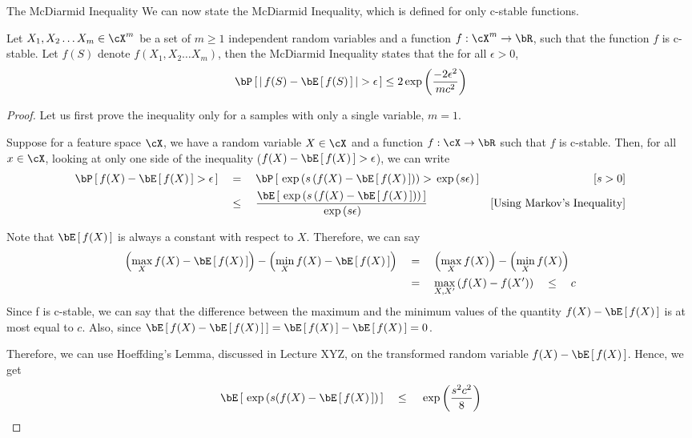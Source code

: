\documentclass[11pt,a4paper]{article}
\begin{document}
\begin{ssection}{The McDiarmid Inequality}
	We can now state the McDiarmid Inequality, which is defined for only c-stable functions. \br
	
	\begin{theorem}
		Let $X_1, X_2 \dots X_m \in \cX^m$ be a set of $m \ge 1$ independent random variables and a function $f : \cX^m \ra \bR$, such that the function $f$ is c-stable. Let $f(S)$ denote $f(X_1, X_2 \dots X_m)$, then the McDiarmid Inequality states that the for all $\epsilon > 0$,
		\begin{equation}
			\prob{\abs{f(S) - \E{f(S)}} > \epsilon}	\le 2 \texp{\frac{-2 \epsilon^2}{m c^2}}
			\label{eq:mcdiarmid}
		\end{equation}
		\label{def:mcdiarmid}
	\end{theorem}
	
	\begin{proof}
		Let us first prove the inequality only for a samples with only a single variable, \ie $m  = 1$.
		
		Suppose for a feature space $\cX$, we have a random variable $X \in \cX$ and a function $f : \cX \ra \bR$ such that $f$ is c-stable. Then, for all $x \in \cX$, looking at only one side of the inequality (\ie $f(X) - \E{f(X)} > \epsilon$), we can write
		\begin{align*}
			\prob{f(X) - \E{f(X)} > \epsilon} & \eq	\prob{\texp{s \para{f(X) - \E{f(X)}}} > \texp{s \epsilon}}	\mcmnt{$s > 0$}                       \\
			                                  & \qle	\frac{\E{\texp{s \para{f(X) - \E{f(X)}}}}}{\texp{s \epsilon}} \mcmnt{Using Markov's Inequality} 
		\end{align*}
		
		Note that $\E{f(X)}$ is always a constant with respect to $X$. Therefore, we can say
		\begin{align*}
			\para{\max_{X} f(X) - \E{f(X)}} - \para{\min_{X} f(X) - \E{f(X)}} & \eq	\para{\max_{X} f(X)} - \para{\min_{X} f(X)} \\
			                                                                  & \eq	\max_{X, X'} \para{f(X) - f(X')} \qle c     
		\end{align*}
		Since f is c-stable, we can say that the difference between the maximum and the minimum values of the quantity $f(X) - \E{f(X)}$ is at most equal to $c$. Also, since $\E{f(X) - \E{f(X)}} = \E{f(X)} - \E{f(X)} = 0$.
		
		Therefore, we can use Hoeffding's Lemma, discussed in Lecture XYZ, on the transformed random variable $f(X) - \E{f(X)}$. Hence, we get
		\begin{align*}
			\E{\texp{s(f(X) - \E{f(X)}}}	\qle	\texp{\frac{s^2 c^2}{8}} 
		\end{align*}
		

\end{proof}
\end{ssection}
\end{document}
